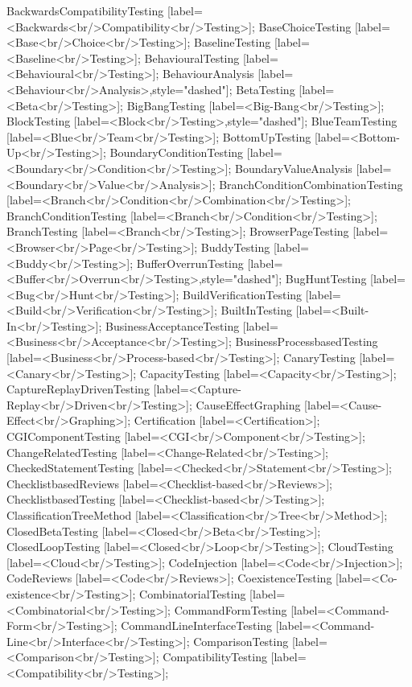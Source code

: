 \documentclass{article}
\begin{document}
{BackwardsCompatibilityTesting [label=<Backwards<br/>Compatibility<br/>Testing>];
BaseChoiceTesting [label=<Base<br/>Choice<br/>Testing>];
BaselineTesting [label=<Baseline<br/>Testing>];
BehaviouralTesting [label=<Behavioural<br/>Testing>];
BehaviourAnalysis [label=<Behaviour<br/>Analysis>,style="dashed"];
BetaTesting [label=<Beta<br/>Testing>];
BigBangTesting [label=<Big-Bang<br/>Testing>];
BlockTesting [label=<Block<br/>Testing>,style="dashed"];
BlueTeamTesting [label=<Blue<br/>Team<br/>Testing>];
BottomUpTesting [label=<Bottom-Up<br/>Testing>];
BoundaryConditionTesting [label=<Boundary<br/>Condition<br/>Testing>];
BoundaryValueAnalysis [label=<Boundary<br/>Value<br/>Analysis>];
BranchConditionCombinationTesting [label=<Branch<br/>Condition<br/>Combination<br/>Testing>];
BranchConditionTesting [label=<Branch<br/>Condition<br/>Testing>];
BranchTesting [label=<Branch<br/>Testing>];
BrowserPageTesting [label=<Browser<br/>Page<br/>Testing>];
BuddyTesting [label=<Buddy<br/>Testing>];
BufferOverrunTesting [label=<Buffer<br/>Overrun<br/>Testing>,style="dashed"];
BugHuntTesting [label=<Bug<br/>Hunt<br/>Testing>];
BuildVerificationTesting [label=<Build<br/>Verification<br/>Testing>];
BuiltInTesting [label=<Built-In<br/>Testing>];
BusinessAcceptanceTesting [label=<Business<br/>Acceptance<br/>Testing>];
BusinessProcessbasedTesting [label=<Business<br/>Process-based<br/>Testing>];
CanaryTesting [label=<Canary<br/>Testing>];
CapacityTesting [label=<Capacity<br/>Testing>];
CaptureReplayDrivenTesting [label=<Capture-Replay<br/>Driven<br/>Testing>];
CauseEffectGraphing [label=<Cause-Effect<br/>Graphing>];
Certification [label=<Certification>];
CGIComponentTesting [label=<CGI<br/>Component<br/>Testing>];
ChangeRelatedTesting [label=<Change-Related<br/>Testing>];
CheckedStatementTesting [label=<Checked<br/>Statement<br/>Testing>];
ChecklistbasedReviews [label=<Checklist-based<br/>Reviews>];
ChecklistbasedTesting [label=<Checklist-based<br/>Testing>];
ClassificationTreeMethod [label=<Classification<br/>Tree<br/>Method>];
ClosedBetaTesting [label=<Closed<br/>Beta<br/>Testing>];
ClosedLoopTesting [label=<Closed<br/>Loop<br/>Testing>];
CloudTesting [label=<Cloud<br/>Testing>];
CodeInjection [label=<Code<br/>Injection>];
CodeReviews [label=<Code<br/>Reviews>];
CoexistenceTesting [label=<Co-existence<br/>Testing>];
CombinatorialTesting [label=<Combinatorial<br/>Testing>];
CommandFormTesting [label=<Command-Form<br/>Testing>];
CommandLineInterfaceTesting [label=<Command-Line<br/>Interface<br/>Testing>];
ComparisonTesting [label=<Comparison<br/>Testing>];
CompatibilityTesting [label=<Compatibility<br/>Testing>];
}
\end{document}
